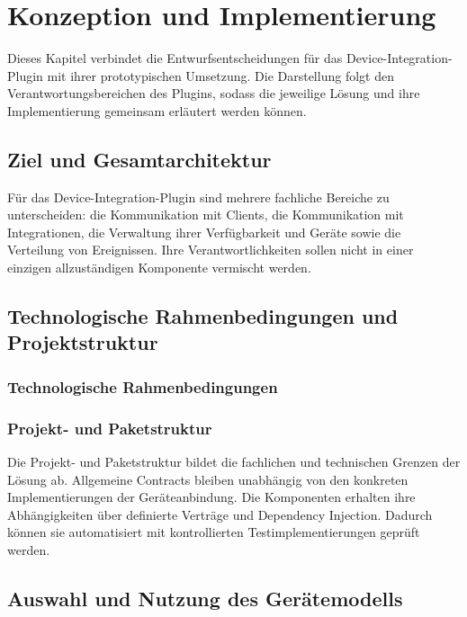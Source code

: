 \chapter{Konzeption und Implementierung}\label{ch:konzeption-implementierung}

Dieses Kapitel verbindet die Entwurfsentscheidungen für das Device-Integration-Plugin mit ihrer prototypischen Umsetzung. Die Darstellung folgt den Verantwortungsbereichen des Plugins, sodass die jeweilige Lösung und ihre Implementierung gemeinsam erläutert werden können.

\section{Ziel und Gesamtarchitektur}

Für das Device-Integration-Plugin sind mehrere fachliche Bereiche zu unterscheiden: die Kommunikation mit Clients, die Kommunikation mit Integrationen, die Verwaltung ihrer Verfügbarkeit und Geräte sowie die Verteilung von Ereignissen. Ihre Verantwortlichkeiten sollen nicht in einer einzigen allzuständigen Komponente vermischt werden.

\section{Technologische Rahmenbedingungen und Projektstruktur}

\subsection{Technologische Rahmenbedingungen}

\subsection{Projekt- und Paketstruktur}

Die Projekt- und Paketstruktur bildet die fachlichen und technischen Grenzen der Lösung ab. Allgemeine Contracts bleiben unabhängig von den konkreten Implementierungen der Geräteanbindung. Die Komponenten erhalten ihre Abhängigkeiten über definierte Verträge und Dependency Injection. Dadurch können sie automatisiert mit kontrollierten Testimplementierungen geprüft werden.

\section{Auswahl und Nutzung des Gerätemodells}

